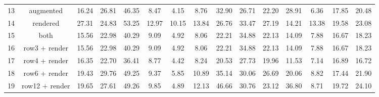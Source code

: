 \documentclass[10pt,twocolumn,letterpaper]{article}
\begin{document}
\begin{table*}[h!]
\begin{tabular}{|c|@{\;}c@{\;}|cccccccccccc|c|}
		13 & augmented & 16.24 & 26.81 & 46.35 & 8.47 & 4.15 & 8.76 & 32.90 & 26.71 & 22.20 & 28.91 & 6.36 & 17.85 & 20.48 \\
		14 & rendered & 27.31 & 24.83 & 53.25 & 12.97 & 10.15 & 13.84 & 26.76 & 33.47 & 27.19 & 14.21 & 13.38 & 19.58 & 23.08 \\ 
		15 & both & 15.56 & 22.98 & 40.29 & 9.09 & 4.92 & 8.06 & 22.21 & 34.88 & 22.13 & 14.09 & 7.88 & 16.67 & 18.23 \\
		
		\hline
		16 & row3 + render & 15.56 & 22.98 & 40.29 & 9.09 & 4.92 & 8.06 & 22.21 & 34.88 & 22.13 
		& 14.09 & 7.88 & 16.67 & 18.23 \\ 
		17 & row4 + render & 16.35 & 22.70 & 36.41 & 8.77 & 4.42 & 8.24 & 20.53 & 27.73 & 19.96 & 11.53 & 7.14 & 16.89 & 16.72 \\ 
		18 & row6 + render & 19.43 & 29.76 & 49.25 & 9.37 & 5.85 & 10.89 & 35.14 & 30.06 & 26.69 
		& 20.06 & 8.82 & 17.44 & 21.90 \\ 
		19 & row12 + render & 19.65 & 27.61 & 49.26 & 9.85 & 4.89 & 12.13 & 46.66 & 30.76 & 
		23.12 & 36.80 & 8.71 & 19.72 & 24.10 \\ 
		\hline


\end{tabular}
\end{table*}
\end{document}
